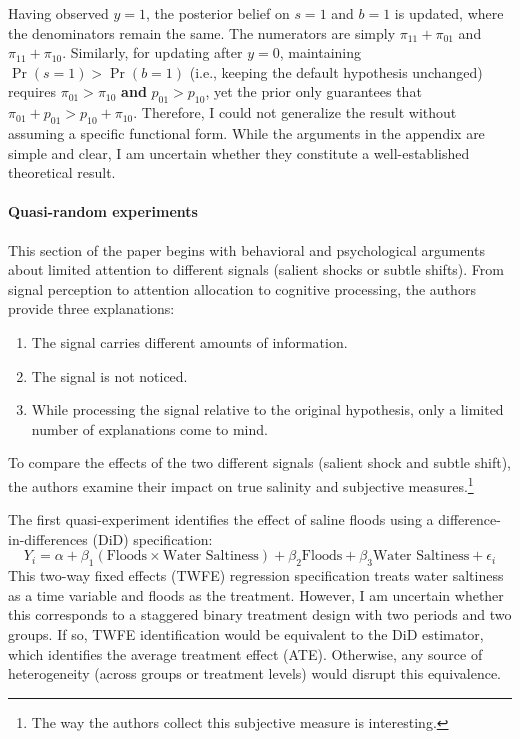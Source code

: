 \documentclass[12pt]{article}[margin=1in]
\begin{document}
Having observed $y=1$, the posterior belief on $s=1$ and $b=1$ is updated, where the denominators remain the same. The numerators are simply $\pi_{11}+\pi_{01}$ and $\pi_{11}+\pi_{10}$. Similarly, for updating after $y=0$, maintaining $\Pr(s=1) > \Pr(b=1)$ (i.e., keeping the default hypothesis unchanged) requires $\pi_{01} > \pi_{10}$ \textbf{and} $p_{01} > p_{10}$, yet the prior only guarantees that $\pi_{01} + p_{01} > p_{10} + \pi_{10}$. Therefore, I could not generalize the result without assuming a specific functional form. While the arguments in the appendix are simple and clear, I am uncertain whether they constitute a well-established theoretical result. 

\paragraph{Quasi-random experiments}
This section of the paper begins with behavioral and psychological arguments about limited attention to different signals (salient shocks or subtle shifts). From signal perception to attention allocation to cognitive processing, the authors provide three explanations:
\begin{enumerate}
    \item The signal carries different amounts of information.
    \item The signal is not noticed.
    \item While processing the signal relative to the original hypothesis, only a limited number of explanations come to mind.
\end{enumerate}

To compare the effects of the two different signals (salient shock and subtle shift), the authors examine their impact on true salinity and subjective measures.\footnote{The way the authors collect this subjective measure is interesting.} 

The first quasi-experiment identifies the effect of saline floods using a difference-in-differences (DiD) specification:
\begin{equation}
    Y_i = \alpha + \beta_1 (\text{Floods} \times \text{Water Saltiness}) + \beta_2 \text{Floods} + \beta_3 \text{Water Saltiness} + \epsilon_i
\end{equation}
This two-way fixed effects (TWFE) regression specification treats water saltiness as a time variable and floods as the treatment. However, I am uncertain whether this corresponds to a staggered binary treatment design with two periods and two groups. If so, TWFE identification would be equivalent to the DiD estimator, which identifies the average treatment effect (ATE). Otherwise, any source of heterogeneity (across groups or treatment levels) would disrupt this equivalence.
\end{document}
